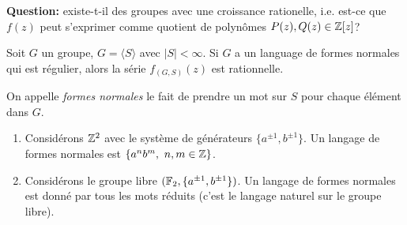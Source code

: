     
    \textbf{Question:} existe-t-il des groupes avec une croissance rationelle, i.e. est-ce que $f(z)$ peut
    s'exprimer comme quotient de polynômes $P(z), Q(z) \in \mathbb{Z}[z]$?


    \begin{theo}
      Soit $G$ un groupe, $G = \langle S \rangle$ avec $|S| < \infty$. Si $G$ a un language de formes normales
      qui est régulier, alors la série $f_{(G, S)}(z)$ est rationnelle.
    \end{theo}

    \begin{defi}
      On appelle \emph{formes normales}  le fait de prendre un mot sur $S$ pour chaque
      élément dans $G$.
    \end{defi}

    \begin{exs}
      \begin{enumerate}
      \item Considérons $\mathbb{Z}^2$ avec le système de générateurs $\{a^{\pm 1}, b^{\pm 1}\}$. Un langage de
        formes normales est $\{a^nb^m,\ n, m \in \Z\}$.

      \item Considérons le groupe libre $(\mathbb{F}_2, \{a^{\pm 1}, b^{\pm 1}\})$. Un langage de formes normales est
        donné par tous les mots réduits (c'est le langage naturel sur le groupe libre).
      \end{enumerate}
    \end{exs}


    
    

    

    
    



    

    

    


